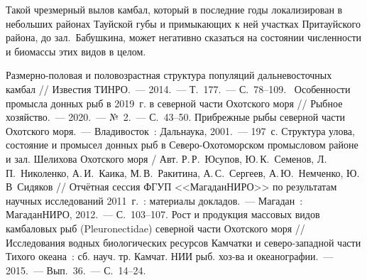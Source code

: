Такой чрезмерный вылов камбал, который в последние годы локализирован в небольших районах Тауйской губы и примыкающих к ней участках Притауйского района, до зал.~Бабушкина, может негативно сказаться на состоянии численности и биомассы этих видов в целом.


\begin{thebibliography}{99}

\bibitem{}
 Размерно-половая и половозрастная структура популяций дальневосточных камбал // Известия ТИНРО.~--- 2014.~--- Т.~177.~--- С.~78--109.
\bibitem{}
 Особенности промысла донных рыб в 2019~г. в северной части Охотского моря // Рыбное хозяйство.~--- 2020.~--- №~2.~--- С.~43--50.
\bibitem{}
 Прибрежные рыбы северной части Охотского моря.~--- Владивосток~: Дальнаука, 2001.~--- 197~с.
\bibitem{}
 Структура улова, состояние и промысел донных рыб в Северо-Охотоморском промысловом районе и зал. Шелихова Охотского моря / Авт. Р.\,Р.~Юсупов, Ю.\,К.~Семенов, Л.\,П.~Николенко, А.\,И.~Каика, М.\,В.~Ракитина, А.\,С.~Сергеев, А.\,Ю.~Немченко, Ю.\,В~Сидяков  // Отчётная сессия ФГУП <<МагаданНИРО>> по результатам научных исследований 2011~г.~: материалы докладов.~--- Магадан~: МагаданНИРО, 2012.~--- С.~103--107.
\bibitem{}
 Рост и продукция массовых видов камбаловых рыб (Pleuronectidae) северной части Охотского моря // Исследования водных биологических ресурсов Камчатки и северо-западной части Тихого океана~: сб. науч. тр. Камчат. НИИ рыб. хоз-ва и океанографии.~--- 2015.~--- Вып.~36.~--- С.~14--24.
\end{thebibliography}
